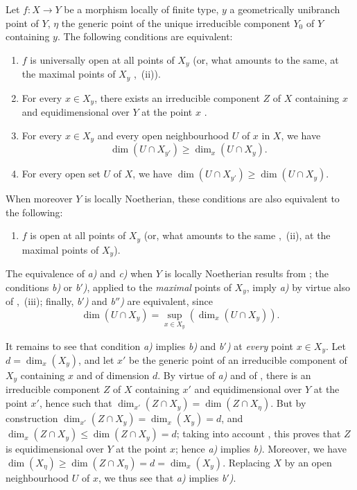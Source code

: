 \begin{corollary}[14.4.2]
\label{IV.14.4.2}
Let $f:X\to Y$ be a morphism locally of finite type, $y$ a geometrically unibranch point of $Y$, $\eta$ the generic point of the unique irreducible component $Y_0$ of $Y$ containing $y$.
The following conditions are equivalent:
\begin{enumerate}[label=\emph{\alph*)}]
  \item $f$ is universally open at all points of $X_y$ (or, what amounts to the same, at the maximal points of $X_y$ ,~(ii)).
  \item For every $x\in X_y$, there exists an irreducible component $Z$ of $X$ containing $x$ and equidimensional over $Y$ at the point $x$ .
  \item[\emph{b$'$)}] For every $x\in X_y$ and every open neighbourhood $U$ of $x$ in $X$, we have
    \[
      \dim(U\cap X_{y'})\geq\dim_x(U\cap X_y).
    \]
  \item[\emph{b$''$)}] For every open set $U$ of $X$, we have $\dim(U\cap X_{y'})\geq\dim(U\cap X_y)$.
\end{enumerate}
When moreover $Y$ is locally Noetherian, these conditions are also equivalent to the following:
\begin{enumerate}[label=\emph{\alph*)}]
  \item[\emph{c)}] $f$ is open at all points of $X_y$ (or, what amounts to the same ,~(ii), at the maximal points of $X_y$).
\end{enumerate}
The equivalence of \emph{a)} and \emph{c)} when $Y$ is locally Noetherian results from ; the conditions \emph{b)} or \emph{b$'$)}, applied to the \emph{maximal} points of $X_y$, imply \emph{a)} by virtue also of ,~(iii); finally, \emph{b$'$)} and \emph{b$''$)} are equivalent, since
\[
  \dim(U\cap X_y) = \sup_{x\in X_y}(\dim_x(U\cap X_y)).
\]

It remains to see that condition \emph{a)} implies \emph{b)} and \emph{b$'$)} at \emph{every} point $x\in X_y$.
Let $d=\dim_x(X_y)$, and let $x'$ be the generic point of an irreducible component of $X_y$ containing $x$ and of dimension $d$.
By virtue of \emph{a)} and of , there is an irreducible component $Z$ of $X$ containing $x'$ and equidimensional over $Y$ at the point $x'$, hence such that $\dim_{x'}(Z\cap X_y)=\dim(Z\cap X_\eta)$.
But by construction $\dim_{x'}(Z\cap X_y)=\dim_x(X_y)=d$, and $\dim_x(Z\cap X_y)\leq\dim(Z\cap X_y)=d$; taking into account , this proves that $Z$ is equidimensional over $Y$ at the point $x$; hence \emph{a)} implies \emph{b)}.
Moreover, we have $\dim(X_\eta)\geq\dim(Z\cap X_\eta)=d=\dim_x(X_y)$.
Replacing $X$ by an open neighbourhood $U$ of $x$, we thus see that \emph{a)} implies \emph{b$'$)}.
\end{corollary}

